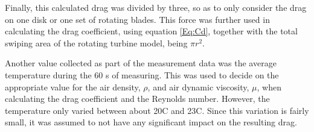 Finally, this calculated drag was divided by three, so as to only consider the drag on one disk or one set of rotating blades. This force was further used in calculating the drag coefficient, using equation \ref{Eq:Cd}, together with the total swiping area of the rotating turbine model, being $\pi r^2$.

Another value collected as part of the measurement data was the average temperature during the 60 \si{\s} of measuring. This was used to decide on the appropriate value for the air density, $\rho$, and air dynamic viscosity, $\mu$, when calculating the drag coefficient and the Reynolds number. However, the temperature only varied between about 20\degree C and 23\degree C. Since this variation is fairly small, it was assumed to not have any significant impact on the resulting drag.

\FloatBarrier

